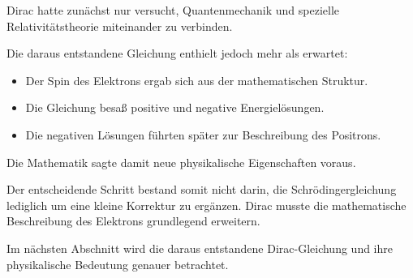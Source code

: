 \begin{HistoryBox}
	\label{box:diracs_ergebnis_weg_dirac}
	
	Dirac hatte zunächst nur versucht, Quantenmechanik und spezielle
	Relativitätstheorie miteinander zu verbinden.
	
	Die daraus entstandene Gleichung enthielt jedoch mehr als erwartet:
	
	\begin{itemize}
		\item Der Spin des Elektrons ergab sich aus der mathematischen
		Struktur.
		\item Die Gleichung besaß positive und negative Energielösungen.
		\item Die negativen Lösungen führten später zur Beschreibung des
		Positrons.
	\end{itemize}
	
	Die Mathematik sagte damit neue physikalische Eigenschaften voraus.
\end{HistoryBox}

Der entscheidende Schritt bestand somit nicht darin, die
Schrödingergleichung lediglich um eine kleine Korrektur zu ergänzen.
Dirac musste die mathematische Beschreibung des Elektrons grundlegend
erweitern.

Im nächsten Abschnitt wird die daraus entstandene Dirac-Gleichung und
ihre physikalische Bedeutung genauer betrachtet.
